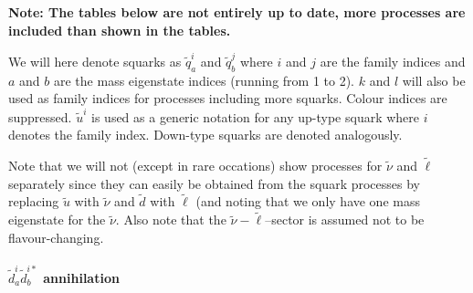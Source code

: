 \documentclass[a4paper,10pt,oneside]{book}
\begin{document}
{\bfseries Note: The tables below are not entirely up to date, more processes are included
than shown in the tables.}

\smallskip

We will here denote squarks as $\tilde{q}^i_a$ and $\tilde{q}^j_b$ where $i$ and
$j$ are the family indices and $a$ and $b$ are the mass eigenstate indices
(running from 1 to 2). $k$ and $l$ will also be used as family indices for processes including more squarks. Colour indices are suppressed. $\tilde{u}^i$ is used as a
generic notation for any up-type squark where $i$ denotes the family index. Down-type 
squarks are denoted analogously.

Note that we will not (except in rare occations) show processes for $\tilde{\nu}$
and $\tilde{\ell}$ separately since they can easily be obtained from the squark
processes by replacing $\tilde{u}$ with $\tilde{\nu}$ and 
$\tilde{d}$ with $\tilde{\ell}$ (and noting that we only have one mass eigenstate
for the $\tilde{\nu}$. Also note that the $\tilde{\nu}-\tilde{\ell}$--sector
is assumed not to be flavour-changing.

\paragraph{$\tilde{d}^i_{a}\tilde{d}_{b}^{i*}$ annihilation}
\end{document}
